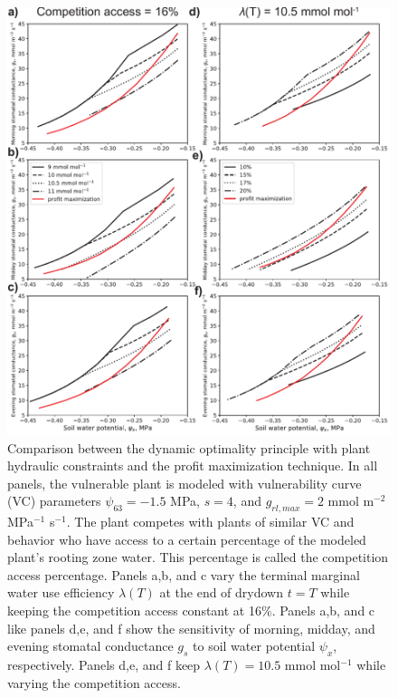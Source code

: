 \documentclass[utf8]{frontiersSCNS} %
\begin{document}
\begin{figure}[h]
    \begin{center}
         \includegraphics[scale=0.75]{profit_compare.pdf}   
    \end{center}
    \caption{Comparison between the dynamic optimality principle with plant hydraulic constraints and the profit maximization technique. In all panels, the vulnerable plant is modeled with vulnerability curve (VC) parameters $\psi_{63} = -1.5$ MPa, $s=4$, and $g_{rl,max} = 2$ mmol m$^{-2}$ MPa$^{-1}$ s$^{-1}$. The plant competes with plants of similar VC and behavior who have access to a certain percentage of the modeled plant's rooting zone water. This percentage is called the competition access percentage. Panels a,b, and c vary the terminal marginal water use efficiency $\lambda(T)$ at the end of drydown $t=T$ while keeping the competition access constant at 16\%. Panels a,b, and c like panels d,e, and f show the sensitivity of morning, midday, and evening  stomatal conductance $g_s$ to soil water potential $\psi_x$, respectively. Panels d,e, and f keep $\lambda(T) = 10.5$ mmol mol$^{-1}$ while varying the competition access.} 
    \label{fig:profit_compare}
\end{figure}
\end{document}
